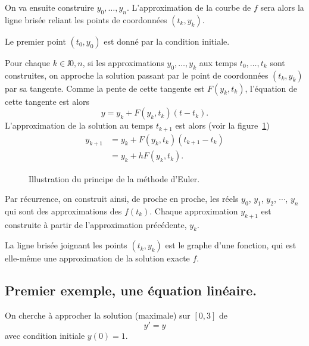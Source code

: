\clearslide{}

On va ensuite construire $y_0,\dots,y_n$. L'approximation de la courbe de $f$ sera alors la ligne brisée reliant les points de coordonnées $(t_k,y_k)$. 

Le premier point $(t_0,y_0)$ est donné par la condition initiale. 

Pour chaque $k \in \ii{0,n}$, si les approximations $y_0,\dots,y_k$ aux temps $t_0,\dots,t_k$ sont construites, on approche la solution passant par le point de coordonnées $(t_k,y_k)$ par sa tangente. 
Comme la pente de cette tangente est $F(y_k,t_k)$, l'équation de cette tangente est alors 
\begin{equation*}
  y = y_k + F(y_k,t_k) (t-t_k). 
\end{equation*}
L'approximation de la solution au temps $t_{k+1}$ est alors (voir la figure~\ref{11:fig:principeEuler})
\begin{align*}
  y_{k+1} &= y_k + F(y_k,t_k) (t_{k+1}-t_k) \\
          &= y_k + hF(y_k,t_k).
\end{align*}

\clearslide{}


\begin{figure}[h!]
\begin{center}
\resizebox{0.8\textwidth}{!}{}
\caption{Illustration du principe de la méthode d'Euler.}
\label{11:fig:principeEuler}
\end{center}
\end{figure}
\clearslide{}

Par récurrence, on construit ainsi, de proche en proche, les réels $y_0$, $y_1$, $y_2$, $\cdots$, $y_n$ qui 
sont des approximations des $f(t_k)$. Chaque approximation $y_{k+1}$ est construite à partir de 
l'approximation précédente, $y_k$.

La ligne brisée joignant les points $(t_k,y_k)$ est le graphe d'une fonction, qui est elle-même une 
approximation de la solution exacte $f$.

\subsection{Premier exemple, une équation linéaire.}
On cherche à approcher la solution (maximale) sur $[0,3]$ de
\begin{equation*}
  y' = y
\end{equation*}
avec condition initiale $y(0)=1$.

